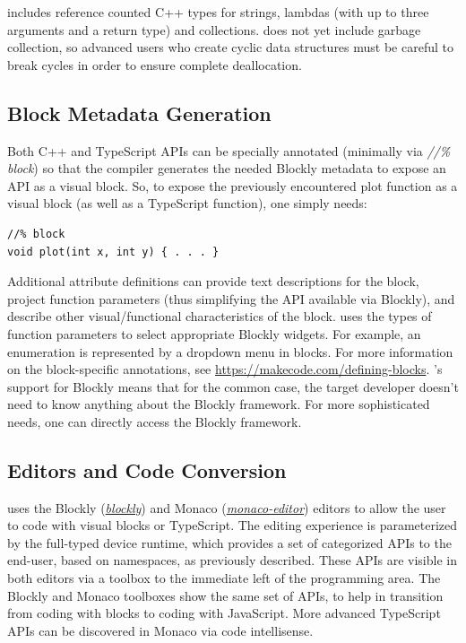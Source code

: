 \MC includes reference counted C++ types for strings, lambdas (with
up to three arguments and a return type) and collections.  
\MC does not yet include garbage collection, so advanced users who create cyclic
data structures must be careful to break cycles in order to ensure complete deallocation. 

\subsection{Block Metadata Generation}

Both C++ and TypeScript APIs can be specially annotated (minimally via 
\emph{//\% block}) so that the \MC compiler generates the needed
Blockly metadata to expose an API as a visual block. So, to expose the previously
encountered plot function as a visual block (as well as a TypeScript function), one simply needs:
\begin{lstlisting}
//% block
void plot(int x, int y) { . . . }
\end{lstlisting}

Additional attribute definitions can provide text descriptions for the block, project function
parameters (thus simplifying the API available via Blockly), and describe other visual/functional
characteristics of the block.  \MC uses the types of function parameters to select appropriate
Blockly widgets.  For example, an enumeration is represented by a dropdown menu in blocks.
For more information on the block-specific annotations, see 
\url{https://makecode.com/defining-blocks}. 
\MCN's support for Blockly means that for the common case, the target developer doesn't need
to know anything about the Blockly framework.  For more sophisticated needs, one can directly access
the Blockly framework. 

\subsection{Editors and Code Conversion}

\MC uses the Blockly (\emph{\href{https://github.com/google/blockly}{blockly}}) and Monaco 
(\emph{\href{https://github.com/Microsoft/monaco-editor}{monaco-editor}}) editors to allow the user to code with
visual blocks or TypeScript. The editing experience is parameterized by the full-typed device
runtime, which provides a set of categorized APIs to the end-user, based on namespaces, as
previously described. These APIs are visible in both editors via a toolbox to the immediate
left of the programming area. The Blockly and Monaco toolboxes show the same set of APIs, to
help in transition from coding with blocks to coding with JavaScript. More advanced TypeScript
APIs can be discovered in Monaco via code intellisense.


